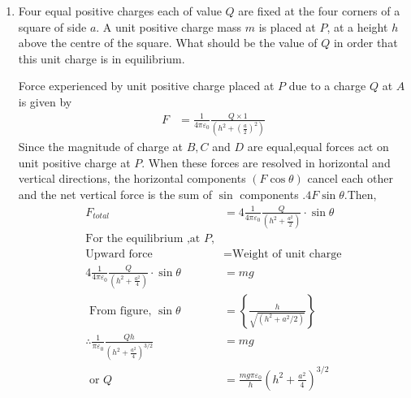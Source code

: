 \begin{enumerate}[label=\color{ocre}\textbf{\arabic*.}]
\begin{answer}
\end{answer}
\item Four equal positive charges each of value $Q$ are fixed at the four corners of a square of side $a$. A unit positive charge mass $m$ is placed at $P$, at a height $h$ above the centre of the square. What should be the value of $Q$ in order that this unit charge is in equilibrium.
\begin{answer}
	Force experienced by unit positive charge placed at $P$ due to a charge $Q$ at $A$ is given by
	\begin{align*}
	F&=\frac{1}{4 \pi \varepsilon_{0}} \frac{Q \times 1}{\left(h^{2}+(\frac{a}{2})^{2}\right)}
	\end{align*}
	Since the magnitude of charge at $B, C$ and $D$ are equal,equal forces act on unit positive charge at $P$. When these forces are resolved in horizontal and vertical directions, the horizontal components $(F \cos \theta)$ cancel each other and the net vertical force is the sum of $\sin$ components .$4 F \sin \theta$.Then,
	\begin{align*}
	F_{total}&=4 \frac{1}{4 \pi \varepsilon_{0}} \frac{Q}{\left(h^{2}+\frac{a^{2}}{2}\right)} \cdot \sin \theta\\
	\text{For the equilibrium ,at $P$,}\\
	\text{Upward force}&=\text{Weight of unit charge}\\
	4 \frac{1}{4 \pi \varepsilon_{0}} \frac{Q}{\left(h^{2}+\frac{a^{2}}{4}\right)} \cdot \sin \theta&=m g\\
		\text { From figure, } \sin \theta&=\left\{\frac{h}{\sqrt{\left(h^{2}+a^{2} / 2\right)}}\right\} \\
	\therefore \frac{1}{\pi \varepsilon_{0}} \frac{Q h}{\left(h^{2}+\frac{a^{2}}{4}\right)^{3 / 2}}&=m g \\\text {  or } Q&=\frac{m g \pi \varepsilon_{0}}{h}\left(h^{2}+\frac{a^{2}}{4}\right)^{3 / 2}
	\end{align*}
	

\end{answer}
\end{enumerate}
